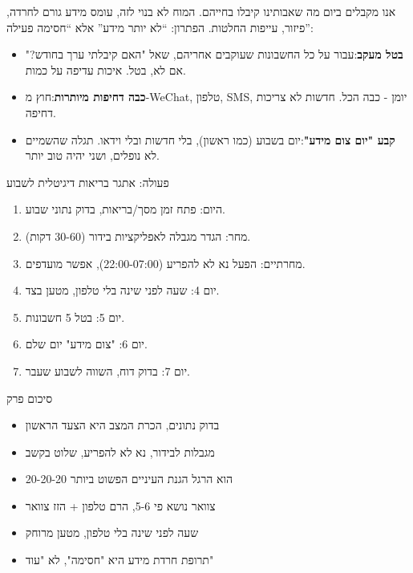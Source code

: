 
אנו מקבלים ביום מה שאבותינו קיבלו בחייהם. המוח לא בנוי לזה, עומס מידע גורם לחרדה, פיזור, עייפות החלטות. הפתרון: “לא יותר מידע” אלא “חסימה פעילה”:

\begin{itemize}
  \item \textbf{בטל מעקב}:עבור על כל החשבונות שעוקבים אחריהם, שאל "האם קיבלתי ערך בחודש?" אם לא, בטל. איכות עדיפה על כמות.
  \item \textbf{כבה דחיפות מיותרות}:חוץ מ-WeChat, טלפון, SMS, יומן - כבה הכל. חדשות לא צריכות דחיפה.
  \item \textbf{קבע "יום צום מידע"}:יום בשבוע (כמו ראשון), בלי חדשות ובלי וידאו. תגלה שהשמיים לא נופלים, ושני יהיה טוב יותר.
\end{itemize}

\begin{tcbpractice}{פעולה: אתגר בריאות דיגיטלית לשבוע}
\begin{enumerate}
  \item היום: פתח זמן מסך/בריאות, בדוק נתוני שבוע.
  \item מחר: הגדר מגבלה לאפליקציות בידור (30-60 דקות).
  \item מחרתיים: הפעל נא לא להפריע (22:00-07:00), אפשר מועדפים.
  \item יום 4: שעה לפני שינה בלי טלפון, מטען בצד.
  \item יום 5: בטל 5 חשבונות.
  \item יום 6: "צום מידע" יום שלם.
  \item יום 7: בדוק דוח, השווה לשבוע שעבר.
\end{enumerate}

\end{tcbpractice}

\begin{tcbsummary}{סיכום פרק}
\begin{itemize}
  \item בדוק נתונים, הכרת המצב היא הצעד הראשון
  \item מגבלות לבידור, נא לא להפריע, שלוט בקשב
  \item 20-20-20 הוא הרגל הגנת העיניים הפשוט ביותר
  \item צוואר נושא פי 5-6, הרם טלפון + הזז צוואר
  \item שעה לפני שינה בלי טלפון, מטען מרוחק
  \item תרופת חרדת מידע היא "חסימה", לא "עוד"
\end{itemize}

\end{tcbsummary}
